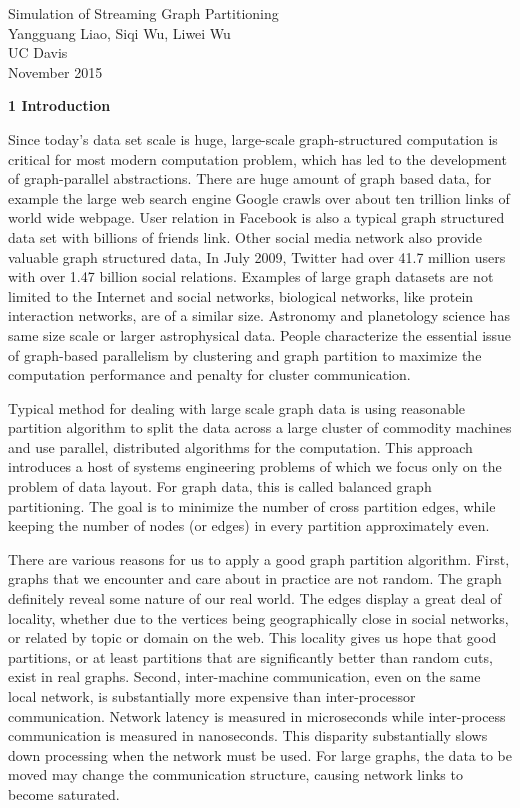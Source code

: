 \documentclass[12pt]{article}
\begin{document}
\begin {center}
{\large  Simulation of Streaming Graph Partitioning} \\
Yangguang Liao, Siqi Wu, Liwei Wu \\
UC Davis\\
November 2015
\end {center}

\textbf{1 Introduction}

Since today's data set scale is huge, large-scale graph-structured computation is critical for most modern computation problem, which has led to the development of graph-parallel abstractions. There are huge amount of graph based data, for example the large web search engine Google crawls over about ten trillion links of world wide webpage. User relation in Facebook is also a typical graph structured data set with billions of friends link. Other social media network also provide valuable graph structured data, In July 2009, Twitter had over 41.7 million
users with over 1.47 billion social relations. Examples of large graph datasets are not limited to the Internet and social networks, biological networks, like protein interaction networks, are of a similar size. Astronomy and planetology science has same size scale or larger astrophysical data. People characterize the essential issue of graph-based parallelism by clustering and graph partition to maximize the computation performance and penalty for cluster communication.

Typical method for dealing with large scale graph data is using reasonable partition algorithm to split the data across a large cluster
of commodity machines and use parallel, distributed algorithms for the computation. This approach introduces a host of systems engineering problems of which we focus only on the problem of data layout. For graph data, this is called balanced graph partitioning. The goal is to minimize the number of cross partition edges, while keeping the number of nodes (or edges) in every partition approximately even.

There are various reasons for us to apply a good graph partition algorithm. First, graphs that we encounter and care about in practice are not random. The graph definitely reveal some nature of our real world. The edges display a great deal of locality, whether due to the vertices being geographically close in social networks, or related by topic or domain on the web. This locality gives us hope that good partitions,
or at least partitions that are significantly better than random cuts, exist in real graphs. Second, inter-machine communication, even on the same local network, is substantially more expensive than inter-processor communication. Network latency is measured in microseconds while inter-process communication is measured in nanoseconds. This disparity substantially slows down processing when the network must be used. For large graphs, the data to be moved may change the communication structure, causing network links to become saturated.
\end{document}
